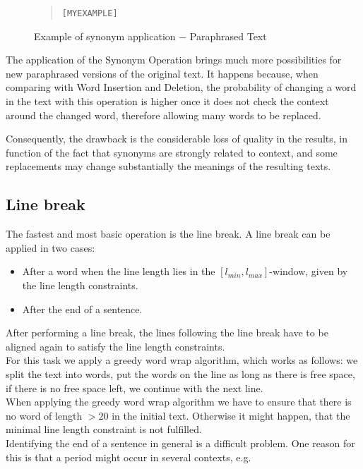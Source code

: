 \documentclass{reportAlternative}
\begin{document}
\begin{figure}[H]
\begin{quote}
\begin{alltt}
[MY EXAMPLE]
\end{alltt}
\end{quote}
\caption{Example of synonym application $-$ Paraphrased Text}
\end{figure}

The application of the Synonym Operation brings much more possibilities for new paraphrased versions of the original text. It happens because, when comparing with Word Insertion and Deletion, the probability of changing a word in the text with this operation is higher once it does not check the context around the changed word, therefore allowing many words to be replaced.

Consequently, the drawback is the considerable loss of quality in the results, in function of the fact that synonyms are strongly related to context, and some replacements may change substantially the meanings of the resulting texts.

\subsection{Line break}
The fastest and most basic operation is the line break. A line break can be applied in two cases:

\begin{itemize}
	\item After a word when the line length lies in the $[l_{min},l_{max}]$-window, 
	given by the line length constraints.
	\item After the end of a sentence.
\end{itemize} 
After performing a line break, the lines following the line break have
to be aligned again to satisfy the line length constraints.\\
For this task we apply a greedy word wrap algorithm, which works as follows: we split the text into words,
put the words on the line as long as there is free space, if there is no free space left, we continue with the next line.\\
When applying the greedy word wrap algorithm we have to ensure that
there is no word of length $> 20$ in the initial text. Otherwise it might happen, that the minimal line
length constraint is not fulfilled.\\
Identifying the end of a sentence in general is a difficult problem. One reason for this is that a period
might occur in several contexts, e.g. 
\end{document}
